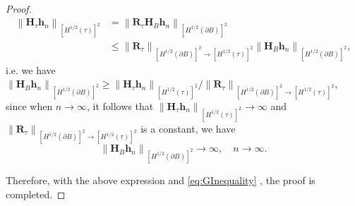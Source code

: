 \documentclass[10pt,a4paper]{amsart}
\begin{document}
\begin{proof}
\begin{equation}\begin{aligned}
\left\| \mathbf H_{\tau} \mathbf h_n \right\|_{\left[H^{1/2}\left(\tau \right) \right]^2 } 
&=\left\|\mathbf R_{\tau} \mathbf H_{B} \mathbf h_n \right\|_{\left[H^{1/2}\left(\partial B \right) \right]^2 } \\
& \leq \left\|\mathbf R_{\tau}\right\|_{\left[H^{1/2}\left(\partial B \right) \right]^2 \to \left[H^{1/2}\left(\tau \right) \right]^2 } \left\| \mathbf H_{B} \mathbf h_n \right\|_{\left[H^{1/2}\left(\partial B \right) \right]^2 } ,
\end{aligned}\end{equation}
i.e. we have $ \left\| \mathbf H_{B} \mathbf h_n \right\|_{\left[H^{1/2}\left(\partial B \right) \right]^2 } \geq \left\| \mathbf H_{\tau} \mathbf h_n \right\|_{\left[H^{1/2}\left(\tau \right) \right]^2 }  / \left\|\mathbf R_{\tau}\right\|_{\left[H^{1/2}\left(\partial B \right) \right]^2 \to \left[H^{1/2}\left(\tau \right) \right]^2 }$, since when $n \to \infty $,  it follows that $\left\| \mathbf H_{\tau} \mathbf h_n \right\|_{\left[H^{1/2}\left(\tau \right) \right]^2 } \to \infty $ and $\left\|\mathbf R_{\tau}\right\|_{\left[H^{1/2}\left(\partial B \right) \right]^2 \to \left[H^{1/2}\left(\tau \right) \right]^2 }$ is a constant, we have
$$
\left\| \mathbf H_{B} \mathbf h_n \right\|_{\left[H^{1/2}\left(\partial B \right) \right]^2 } \to \infty ,\quad n\to\infty.
$$

Therefore, with the above expression and \eqref{eq:GInequality} , the proof is completed.
\end{proof}
\end{document}
